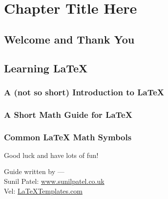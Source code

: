 
\chapter{Chapter Title Here} %

\label{Chapter1} %



\section{Welcome and Thank You}


\section{Learning \LaTeX{}}

\subsection{A (not so short) Introduction to \LaTeX{}}

\subsection{A Short Math Guide for \LaTeX{}}

\subsection{Common \LaTeX{} Math Symbols}

Good luck and have lots of fun!

\begin{flushright}
Guide written by ---\\
Sunil Patel: \href{http://www.sunilpatel.co.uk}{www.sunilpatel.co.uk}\\
Vel: \href{http://www.LaTeXTemplates.com}{LaTeXTemplates.com}
\end{flushright}
